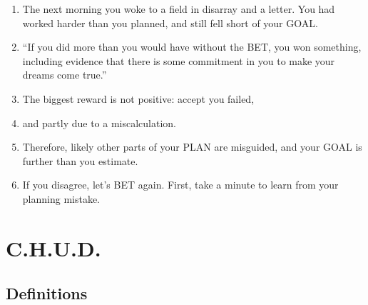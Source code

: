 \documentclass[
]{book}
\providecommand{\tightlist}{%
  \setlength{\itemsep}{0pt}\setlength{\parskip}{0pt}}
\begin{document}
\begin{enumerate}
\def\labelenumi{\arabic{enumi}.}
\setcounter{enumi}{30}
\tightlist
\item
  The next morning you woke to a field in disarray and a letter. You had
  worked harder than you planned, and still fell short of your GOAL.
\item
  ``If you did more than you would have without the BET, you won
  something, including evidence that there is some commitment in you
  to make your dreams come true.''
\item
  The biggest reward is not positive: accept you failed,
\item
  and partly due to a miscalculation.
\item
  Therefore, likely other parts of your PLAN are misguided, and your
  GOAL is further than you estimate.
\item
  If you disagree, let's BET again. First, take a minute to learn from your
  planning mistake.
\end{enumerate}

\hypertarget{c.h.u.d.}{%
\section{C.H.U.D.}\label{c.h.u.d.}}

\hypertarget{definitions}{%
\subsection{Definitions}\label{definitions}}
\end{document}
